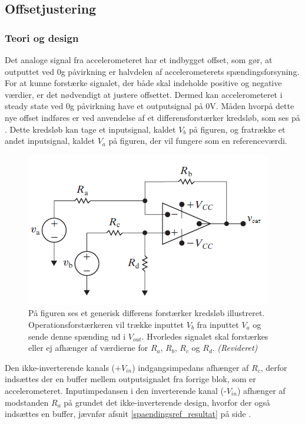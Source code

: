 \subsection{Offsetjustering}
\subsubsection{Teori og design} \label{Offset_Teori_Design}
Det analoge signal fra accelerometeret har et indbygget offset, som gør, at outputtet ved $0$g påvirkning er halvdelen af accelerometerets spændingsforsyning. For at kunne forstærke signalet, der både skal indeholde positive og negative værdier, er det nødvendigt at justere offsettet. Dermed kan accelerometeret i steady state ved $0$g påvirkning have et outputsignal på $0$V. Måden hvorpå dette nye offset indføres er ved anvendelse af et differensforstærker kredsløb, som ses på . Dette kredsløb kan tage et inputsignal, kaldet $V_{b}$ på figuren, og fratrække et andet inputsignal, kaldet $V_{a}$ på figuren, der vil fungere som en referenceværdi.
\begin{figure}[H]
\centering
\includegraphics[scale=1.3]{figures/cProblemloesning/Differensforstaerker_generisk1.png}
\caption{På figuren ses et generisk differens forstærker kredsløb illustreret. Operationsforstærkeren vil trække inputtet $V_{b}$ fra inputtet $V_{a}$ og sende denne spænding ud i $V_{out}$. Hvorledes signalet skal forstærkes eller ej afhænger af værdierne for $R_{a}$, $R_{b}$, $R_{c}$ og $R_{d}$. \textit{(Revideret)} \cite{Nilsson2011}}
\label{fig:Differensforstaerker_generisk}
\end{figure}
Den ikke-inverterende kanals ($+V_{in}$) indgangsimpedans afhænger af $R_{c}$, derfor indsættes der en buffer mellem outputsignalet fra forrige blok, som er accelerometeret. Inputimpedansen i den inverterende kanal (-$V_{in}$) afhænger af modstanden $R_{a}$ på  grundet det ikke-inverterende design, hvorfor der også indsættes en buffer, jævnfør afsnit \ref{spaendingsref_resultat} på side \pageref{spaendingsref_resultat}. \\
